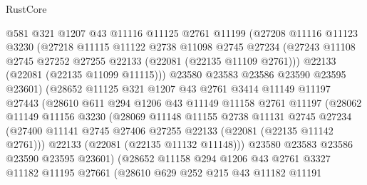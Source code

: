 \begin{lexlean}{RustCore}
\begin{coremodule}
                  @581
                  @321
                  @1207
                  @43
                  @11116
                  @11125
                  @2761
                  @11199
                  (@27208
                    @11116
                    @11123
                    @3230
                    (@27218
                      @11115
                      @11122
                      @2738
                      @11098
                      @2745
                      @27234
                      (@27243 @11108 @2745 @27252 @27255 @22133 (@22081 (@22135 @11109 @2761)))
                      @22133
                      (@22081 (@22135 @11099 @11115)))
                    @23580
                    @23583
                    @23586
                    @23590
                    @23595
                    @23601)
                  (@28652
                    @11125
                    @321
                    @1207
                    @43
                    @2761
                    @3414
                    @11149
                    @11197
                    @27443
                    (@28610
                      @611
                      @294
                      @1206
                      @43
                      @11149
                      @11158
                      @2761
                      @11197
                      (@28062
                        @11149
                        @11156
                        @3230
                        (@28069
                          @11148
                          @11155
                          @2738
                          @11131
                          @2745
                          @27234
                          (@27400 @11141 @2745 @27406 @27255 @22133 (@22081 (@22135 @11142 @2761)))
                          @22133
                          (@22081 (@22135 @11132 @11148)))
                        @23580
                        @23583
                        @23586
                        @23590
                        @23595
                        @23601)
                      (@28652
                        @11158
                        @294
                        @1206
                        @43
                        @2761
                        @3327
                        @11182
                        @11195
                        @27661
                        (@28610
                          @629
                          @252
                          @215
                          @43
                          @11182
                          @11191

\end{coremodule}
\end{lexlean}
